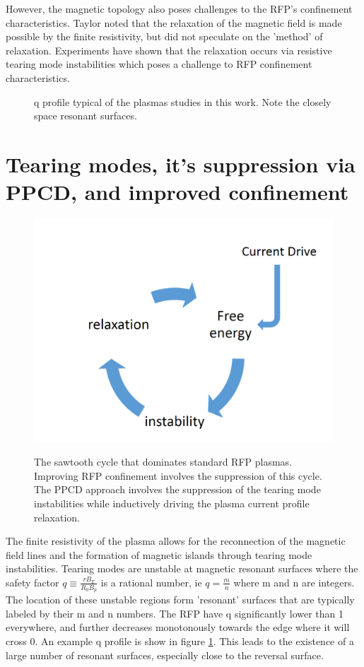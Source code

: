 \begin{refsection}
However, the magnetic topology also poses challenges to the RFP's confinement
characteristics. Taylor noted that the relaxation of the magnetic field is made
possible by the finite resistivity, but did not speculate on the 'method' of
relaxation. Experiments have shown that the relaxation occurs via resistive
tearing mode instabilities which poses a challenge to RFP confinement
characteristics.

\begin{figure}
	\centering
    \label{fig:q_profile}
    
    \caption[Example RPF q profile]{q profile typical of the plasmas studies in this work. Note the closely space resonant surfaces.}

\end{figure}

\section{Tearing modes, it's suppression via PPCD, and improved confinement}
\begin{figure}[!htb]
	\centering
	\includegraphics[width = .6\linewidth]{./1_Introduction/the_sawtooth_cycle.PNG}
	\label{fig:sawtooth_cycle}
	\caption[The sawtooth cycle]{The sawtooth cycle that dominates standard RFP plasmas. Improving RFP confinement involves the suppression of this cycle. The PPCD approach involves the suppression of the tearing mode instabilities while inductively driving the plasma current profile relaxation.}
\end{figure}%

The finite resistivity of the plasma allows for the reconnection of the
magnetic field lines and the formation of magnetic islands through tearing mode
instabilities. Tearing modes are unstable at magnetic resonant surfaces where
the safety factor $q \equiv \frac{rB_T}{R_0B_p}$ is a rational number, ie $q =
\frac{m}{n}$ where m and n are integers. The location of these unstable regions
form 'resonant' surfaces that are typically labeled by their m and n numbers.
The RFP have q significantly lower than 1 everywhere, and further decreases
monotonously towards the edge where it will cross 0. An example q profile is
show in figure \ref{fig:q_profile}. This leads to the existence of a large
number of resonant surfaces, especially close to the reversal surface. 


\end{refsection}
